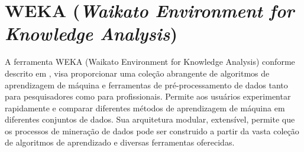 \documentclass[
	12pt,				%
	openright,			%
	oneside,	
	a4paper,				%
	english,				%
	brazil				%
]{abntex2/abntex2} %
\begin{document}
		

	\vspace{-1.5\baselineskip}
	\section{WEKA (\textit{Waikato Environment for Knowledge Analysis})}
	\vspace{1\baselineskip}
	A ferramenta WEKA (Waikato Environment for Knowledge Analysis)  conforme descrito em \cite{hall:2009}, visa proporcionar uma coleção abrangente de algoritmos de aprendizagem de máquina e ferramentas de pré-processamento de dados tanto para pesquisadores como para profissionais. Permite aos usuários experimentar rapidamente e comparar diferentes métodos de aprendizagem de máquina em diferentes conjuntos de dados. Sua arquitetura modular, extensível, permite que os processos de mineração de dados pode ser construido a partir da vasta coleção de algoritmos de aprendizado e diversas ferramentas oferecidas.
	\vspace{-1.5\baselineskip}	
\end{document}
